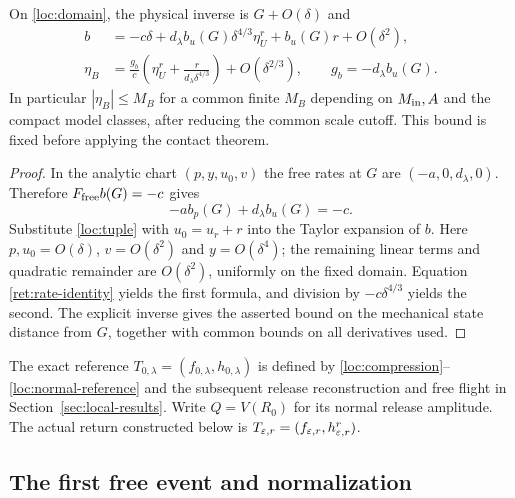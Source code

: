 \begin{lemma}
\label{ret:inverse}
On \eqref{loc:domain}, the physical inverse is $G+O(\delta)$ and
\begin{equation}
 \begin{aligned}
 b&=-c\delta+d_\lambda b_u(G)\delta^{4/3}\eta_U^r+b_u(G)r+O(\delta^2),\\
 \eta_B&=\frac{g_b}{c}
       \left(\eta_U^r+\frac{r}{d_\lambda\delta^{4/3}}\right)
       +O(\delta^{2/3}),\qquad g_b=-d_\lambda b_u(G).
 \end{aligned}
 \label{ret:inverse-expansion}
\end{equation}
In particular $|\eta_B|\le M_B$ for a common finite $M_B$ depending on
$M_{\rm in},A$ and the compact model classes, after reducing the common
scale cutoff. This bound is fixed before applying the contact theorem.
\end{lemma}
\begin{proof}
In the analytic chart $(p,y,u_0,v)$ the free rates at $G$ are
$(-a,0,d_\lambda,0)$. Therefore $F_{\rm free}b(G)=-c$ gives
\begin{equation}
 -a b_p(G)+d_\lambda b_u(G)=-c.\label{ret:rate-identity}
\end{equation}
Substitute \eqref{loc:tuple} with $u_0=u_r+r$ into the Taylor
expansion of $b$. Here $p,u_0=O(\delta)$, $v=O(\delta^2)$ and
$y=O(\delta^4)$; the remaining linear terms and quadratic remainder
are $O(\delta^2)$, uniformly on the fixed domain. Equation
\eqref{ret:rate-identity} yields the first formula, and division by
$-c\delta^{4/3}$ yields the second. The explicit inverse gives the
asserted bound on the mechanical state distance from $G$, together
with common bounds on all derivatives used.
\end{proof}

The exact reference $T_{0,\lambda}=(f_{0,\lambda},h_{0,\lambda})$
is defined by \eqref{loc:compression}--\eqref{loc:normal-reference}
and the subsequent release reconstruction and free flight in
Section~\ref{sec:local-results}. Write $Q=V(R_0)$ for its normal
release amplitude. The actual return constructed below is
$T_{\varepsilon,r}=(f_{\varepsilon,r},h_{\varepsilon,r}^r)$.

\subsection{The first free event and normalization}
\label{sec:flight}

